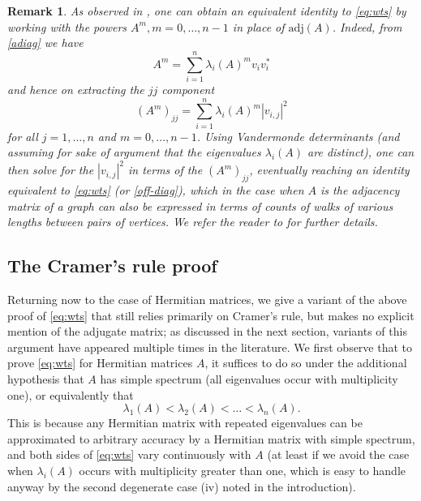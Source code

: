 \documentclass{amsart}
\newtheorem{remark}[lemma]{Remark}
\begin{document}
\begin{remark}  As observed in \cite[Appendix A]{2014arXiv1401.4580V}, one can obtain an equivalent identity to \eqref{eq:wts} by working with the powers $A^m, m=0,\dots,n-1$ in place of $\mathrm{adj}(A)$.  Indeed, from \eqref{adiag} we have
$$ A^m = \sum_{i=1}^n \lambda_i(A)^m v_i v_i^*$$
and hence on extracting the $jj$ component
$$ (A^m)_{jj} = \sum_{i=1}^n \lambda_i(A)^m |v_{i,j}|^2$$
for all $j=1,\dots,n$ and $m=0,\dots,n-1$.  Using Vandermonde determinants (and assuming for sake of argument that the eigenvalues $\lambda_i(A)$ are distinct), one can then solve for the $|v_{i,j}|^2$ in terms of the $(A^m)_{jj}$, eventually reaching an identity \cite[Theorem 2]{2014arXiv1401.4580V} equivalent to \eqref{eq:wts} (or \eqref{off-diag}), which in the case when $A$ is the adjacency matrix of a graph can also be expressed in terms of counts of walks of various lengths between pairs of vertices. We refer the reader to \cite{2014arXiv1401.4580V} for further details.
\end{remark}

\subsection{The Cramer's rule proof}\label{cramer-sec}

Returning now to the case of Hermitian matrices, we give a variant of the above proof of \eqref{eq:wts} that still relies primarily on Cramer's rule, but makes no explicit mention of the adjugate matrix; as discussed in the next section, variants of this argument have appeared multiple times in the literature.  We first observe that to prove \eqref{eq:wts} for Hermitian matrices $A$, it suffices to do so under the additional hypothesis that $A$ has simple spectrum (all eigenvalues occur with multiplicity one), or equivalently that
$$ \lambda_1(A) < \lambda_2(A) < \dots < \lambda_n(A).$$
This is because any Hermitian matrix with repeated eigenvalues can be approximated to arbitrary accuracy by a Hermitian matrix with simple spectrum, and both sides of \eqref{eq:wts} vary continuously with $A$ (at least if we avoid the case when $\lambda_i(A)$ occurs with multiplicity greater than one, which is easy to handle anyway by the second degenerate case (iv) noted in the introduction).
\end{document}
